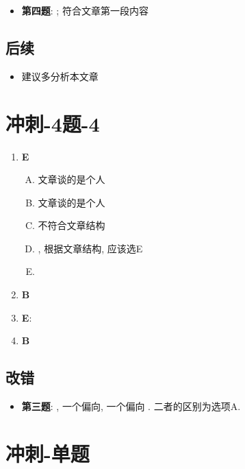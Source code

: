    \begin{itemize}
      \item \textbf{第四题}: ; 符合文章第一段内容
    \end{itemize}

  \subsection{后续}

    \begin{itemize}
      \item 建议多分析本文章
    \end{itemize}

\section{冲刺-4题-4}

  \begin{enumerate}
    \item \textbf{E}
    \begin{enumerate}[A.]
      \item 文章谈的是个人
      \item 文章谈的是个人
      \item 不符合文章结构
      \item {}, 根据文章结构, 应该选E
      \item %
    \end{enumerate}

    \item \textbf{B}
    \item \textbf{E}: 
    \item \textbf{B}
  \end{enumerate}

  \subsection{改错}

    \begin{itemize}
      \item \textbf{第三题}: , 一个偏向, 一个偏向
      . 二者的区别为选项A.
    \end{itemize}

\section{冲刺-单题}

